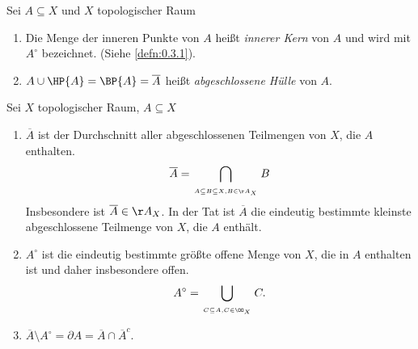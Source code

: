 \begin{defn}
\label{defn:1.1.12}
Sei $A\subseteq X$ und $X$ topologischer Raum
\begin{enumerate}
  \item Die Menge der inneren Punkte von $A$ heißt \emph{innerer Kern} von $A$
  und wird mit $A^\circ$ bezeichnet. (Siehe \ref{defn:0.3.1}).
  \item $A\cup\HP{A} = \BP{A} = \overline{A}$ heißt
  \emph{abgeschlossene Hülle} von $A$.\fishhere
\end{enumerate}
\end{defn}

\begin{lem}
\label{prop:1.1.13}
Sei $X$ topologischer Raum, $A\subseteq X$
\begin{enumerate}
  \item $\overline{A}$ ist der Durchschnitt aller abgeschlossenen Teilmengen von
  $X$, die $A$ enthalten.
\begin{align*}
\overline{A} = \bigcap\limits_{\atop{A\subseteq B\subseteq X,}{B\in\AA_X}} B
\end{align*}
Insbesondere ist $\overline{A}\in\AA_X$. In der Tat ist $\overline{A}$ die
eindeutig bestimmte kleinste abgeschlossene Teilmenge von $X$, die $A$ enthält.
\item $A^\circ$ ist die eindeutig bestimmte größte offene Menge von $X$, die in
$A$ enthalten ist und daher insbesondere offen.
\begin{align*}
A^\circ = \bigcup\limits_{\atop{C\subseteq A,}{C\in\OO_X}} C.
\end{align*}
\item $\overline{A} \setminus A^\circ = \partial A = \overline{A} \cap
\overline{A}^c$.\fishhere
\end{enumerate}
\end{lem}

